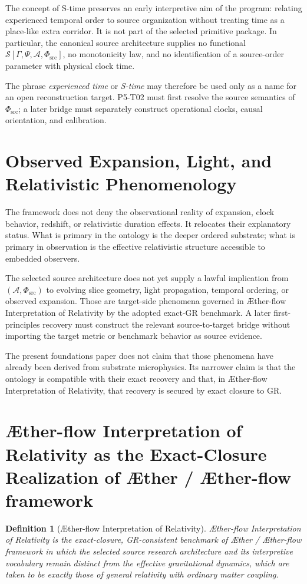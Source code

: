 \documentclass[11pt]{article}
\newcommand{\Aether}{\AE{}ther}
\newcommand{\Aflow}{\AE{}ther-flow}
\newcommand{\TheoryName}{\Aflow{} Interpretation of Relativity}
\newcommand{\TheoryProgram}{\Aether{} / \Aflow{} framework}
\newcommand{\Order}{\mathcal{S}}
\newcommand{\Sub}{\mathcal{A}}
\newcommand{\PhiSrc}{\Phi_{\mathrm{src}}}
\newtheorem{definition}{Definition}
\begin{document}
The concept of S-time preserves an early interpretive aim of the program:
relating experienced temporal order to source organization without treating
time as a place-like extra corridor. It is not part of the selected primitive
package. In particular, the canonical source architecture supplies no
functional \(\Order[\Gamma,\Psi,\Sub,\PhiSrc]\), no monotonicity law, and no
identification of a source-order parameter with physical clock time.

The phrase \emph{experienced time} or \emph{S-time} may therefore be used only
as a name for an open reconstruction target. P5-T02 must first resolve the
source semantics of \(\PhiSrc\); a later bridge must separately construct
operational clocks, causal orientation, and calibration.

\section{Observed Expansion, Light, and Relativistic Phenomenology}

The framework does not deny the observational reality of expansion, clock behavior, redshift, or relativistic duration effects. It relocates their explanatory status. What is primary in the ontology is the deeper ordered substrate; what is primary in observation is the effective relativistic structure accessible to embedded observers.

The selected source architecture does not yet supply a lawful implication from
\((\Sub,\PhiSrc)\) to evolving slice geometry, light propagation, temporal
ordering, or observed expansion. Those are target-side phenomena governed in
\TheoryName{} by the adopted exact-GR benchmark. A later first-principles
recovery must construct the relevant source-to-target bridge without importing
the target metric or benchmark behavior as source evidence.

The present foundations paper does not claim that those phenomena have already been derived from substrate microphysics. Its narrower claim is that the ontology is compatible with their exact recovery and that, in \TheoryName{}, that recovery is secured by exact closure to GR.

\section{\TheoryName{} as the Exact-Closure Realization of \TheoryProgram{}}

\begin{definition}[\TheoryName{}]
\TheoryName{} is the exact-closure, GR-consistent benchmark of
\TheoryProgram{} in which the selected source research architecture and its
interpretive vocabulary remain distinct from the effective gravitational
dynamics, which are taken to be exactly those of general relativity with
ordinary matter coupling.
\end{definition}
\end{document}

